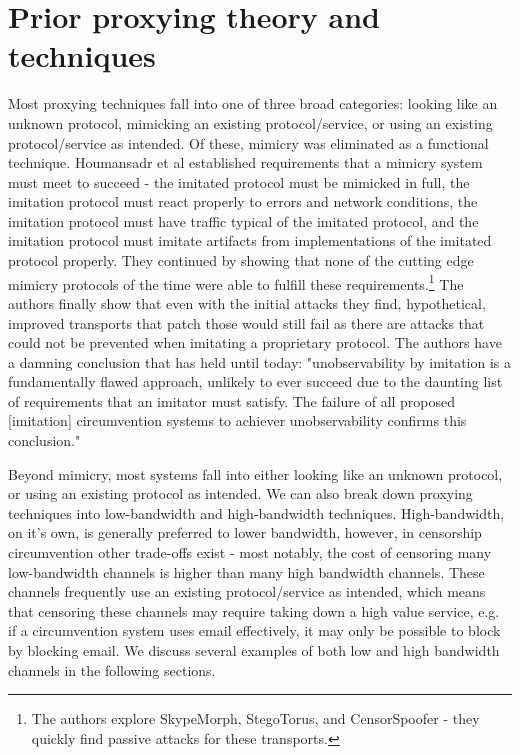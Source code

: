 \documentclass[12pt]{report}
\begin{document}
\section{Prior proxying theory and techniques}
\label{prior}

Most proxying techniques fall into one of three broad categories: looking like an unknown protocol, mimicking an existing protocol/service, or using an existing protocol/service as intended. Of these, mimicry was eliminated as a functional technique. Houmansadr et al established requirements that a mimicry system must meet to succeed - the imitated protocol must be mimicked in full, the imitation protocol must react properly to errors and network conditions, the imitation protocol must have traffic typical of the imitated protocol, and the imitation protocol must imitate artifacts from implementations of the imitated protocol properly.\cite{parrot} They continued by showing that none of the cutting edge mimicry protocols of the time were able to fulfill these requirements.\footnote{The authors explore SkypeMorph, StegoTorus, and CensorSpoofer - they quickly find passive attacks for these transports.\cite{skypemorph}\cite{stegotorus}\cite{censorspoofer}\cite{parrot}} The authors finally show that even with the initial attacks they find, hypothetical, improved transports that patch those would still fail as there are attacks that could not be prevented when imitating a proprietary protocol. The authors have a damning conclusion that has held until today: "unobservability by imitation is a fundamentally flawed approach, unlikely to ever succeed due to the daunting list of requirements that an imitator must satisfy. The failure of all proposed [imitation] circumvention systems to achiever unobservability confirms this conclusion."\cite{parrot}

Beyond mimicry, most systems fall into either looking like an unknown protocol, or using an existing protocol as intended. We can also break down proxying techniques into low-bandwidth and high-bandwidth techniques. High-bandwidth, on it's own, is generally preferred to lower bandwidth, however, in censorship circumvention other trade-offs exist - most notably, the cost of censoring many low-bandwidth channels is higher than many high bandwidth channels. These channels frequently use an existing protocol/service as intended, which means that censoring these channels may require taking down a high value service, e.g. if a circumvention system uses email effectively, it may only be possible to block by blocking email. We discuss several examples of both low and high bandwidth channels in the following sections.
\end{document}
